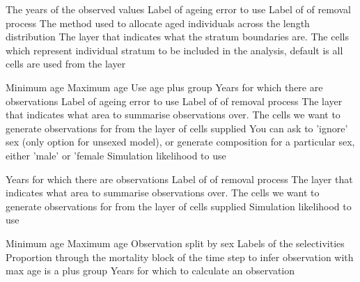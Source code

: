 \par\textbf{}\par
{} {The years of the observed values}
 {Label of ageing error to use}
 {Label of of removal process}
 {The method used to allocate aged individuals across the length distribution}
 {The layer that indicates what the stratum boundaries are.}
 {The cells which represent individual stratum to be included in the analysis, default is all cells are used from the layer}
\par\textbf{}\par
{} {Minimum age}
 {Maximum age}
 {Use age plus group}
 {Years for which there are observations}
 {Label of ageing error to use}
 {Label of of removal process}
 {The layer that indicates what area to summarise observations over.}
 {The cells we want to generate observations for from the layer of cells supplied}
 {You can ask to 'ignore' sex (only option for unsexed model), or generate composition for a particular sex, either 'male' or 'female}
 {Simulation likelihood to use}
\par\textbf{}\par
{} {Years for which there are observations}
 {Label of of removal process}
 {The layer that indicates what area to summarise observations over.}
 {The cells we want to generate observations for from the layer of cells supplied}
 {Simulation likelihood to use}
\par\textbf{}\par
{} {Minimum age}
 {Maximum age}
 {Observation split by sex}
 {Labels of the selectivities}
 {Proportion through the mortality block of the time step to infer observation with}
 {max age is a plus group}
 {Years for which to calculate an observation}
